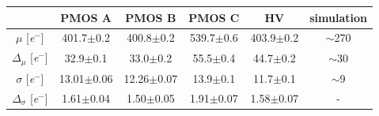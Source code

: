 \begin{frame}
\begin{columns}
        \end{columns}                  
        \begin{table}[h!]
            \footnotesize
            \begin{tabular}{| c |  c | c | c |c || c|}
            \hline
            & PMOS A & PMOS B & PMOS C & HV & simulation \\
            \hline
            \hline
            $\mu$ [\si{\elementarycharge}$^-$] & 401.7$\pm$0.2 & 400.8$\pm$0.2 & 539.7$\pm$0.6 &  403.9$\pm$0.2 & $\sim$270\\
            $\Delta_{\mu}$ [\si{\elementarycharge}$^-$] & 32.9$\pm$0.1 & 33.0$\pm$0.2 & 55.5$\pm$0.4 & 44.7$\pm$0.2 & $\sim$30\\
            $\sigma$ [\si{\elementarycharge}$^-$] & 13.01$\pm$0.06 & 12.26$\pm$0.07 & 13.9$\pm$0.1 & 11.7$\pm$0.1 & $\sim$9 \\
            $\Delta_{\sigma}$ [\si{\elementarycharge}$^-$] & 1.61$\pm$0.04 & 1.50$\pm$0.05 & 1.91$\pm$0.07 & 1.58$\pm$0.07 & -\\
            \hline
            \end{tabular}
        \end{table}       
    \end{frame}



